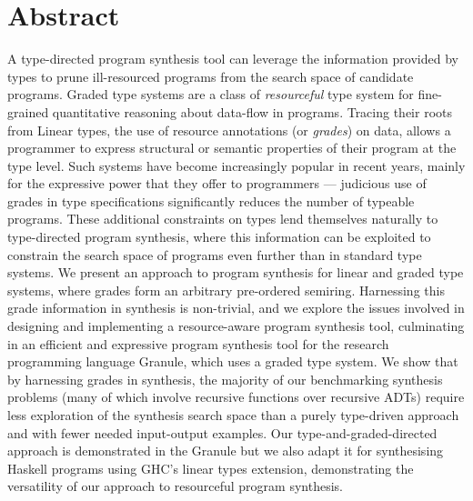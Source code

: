 \begingroup
\let\clearpage\relax
\let\cleardoublepage\relax
\let\cleardoublepage\relax

\chapter*{Abstract}
A type-directed program synthesis tool can leverage the information provided by
types to prune ill-resourced programs from the search space of candidate
programs. Graded type systems are a class of \textit{resourceful} type system
for fine-grained quantitative reasoning about data-flow in programs. Tracing
their roots from Linear types, the use of resource annotations (or
\textit{grades}) on data, allows a programmer to express structural or semantic
properties of their program at the type level. Such systems have become
increasingly popular in recent years, mainly for the expressive power that they
offer to programmers --- judicious use of grades in type specifications
significantly reduces the number of typeable programs. These additional
constraints on types lend themselves naturally to type-directed program
synthesis, where this information can be exploited to constrain the search space
of programs even further than in standard type systems. We present an approach
to program synthesis for linear and graded type systems, where grades form an
arbitrary pre-ordered semiring. Harnessing this grade information in synthesis
is non-trivial, and we explore the issues involved in designing and implementing
a resource-aware program synthesis tool, culminating in an efficient and
expressive program synthesis tool for the research programming language Granule,
which uses a graded type system. We show that by harnessing grades in synthesis,
the majority of our benchmarking synthesis problems (many of which involve
recursive functions over recursive ADTs) require less exploration of the
synthesis search space than a purely type-driven approach and with fewer needed
input-output examples. Our type-and-graded-directed approach is demonstrated in
the Granule but we also adapt it for synthesising Haskell programs using GHC's
linear types extension, demonstrating the versatility of our approach to
resourceful program synthesis. 


\vfill

\endgroup

\vfill
